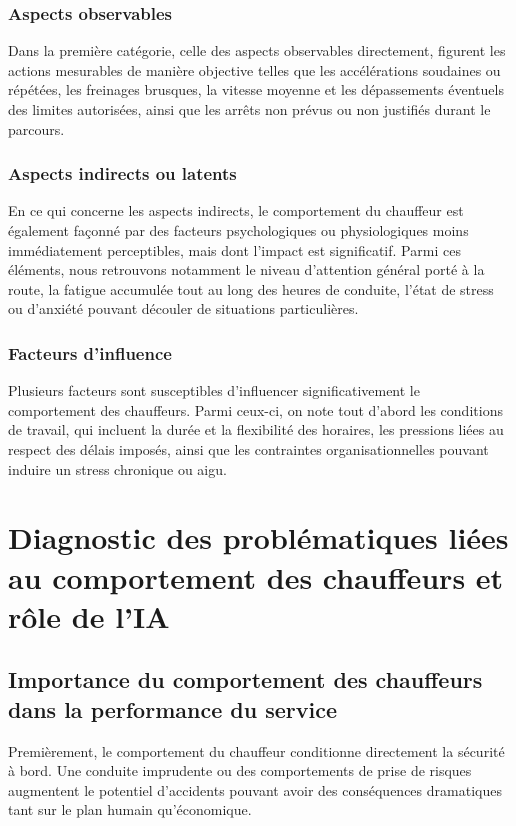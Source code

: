 \documentclass[a4paper, 12pt]{book}
\begin{document}
\subsection{Aspects observables}
Dans la première catégorie, celle des aspects observables directement, figurent les actions mesurables de manière objective telles que les accélérations soudaines ou répétées, les freinages brusques, la vitesse moyenne et les dépassements éventuels des limites autorisées, ainsi que les arrêts non prévus ou non justifiés durant le parcours.

\subsection{Aspects indirects ou latents}
En ce qui concerne les aspects indirects, le comportement du chauffeur est également façonné par des facteurs psychologiques ou physiologiques moins immédiatement perceptibles, mais dont l'impact est significatif. Parmi ces éléments, nous retrouvons notamment le niveau d'attention général porté à la route, la fatigue accumulée tout au long des heures de conduite, l'état de stress ou d'anxiété pouvant découler de situations particulières.

\subsection{Facteurs d'influence}
Plusieurs facteurs sont susceptibles d'influencer significativement le comportement des chauffeurs. Parmi ceux-ci, on note tout d'abord les conditions de travail, qui incluent la durée et la flexibilité des horaires, les pressions liées au respect des délais imposés, ainsi que les contraintes organisationnelles pouvant induire un stress chronique ou aigu.

\chapter{Diagnostic des problématiques liées au comportement des chauffeurs et rôle de l'IA}

\section{Importance du comportement des chauffeurs dans la performance du service}

Premièrement, le comportement du chauffeur conditionne directement la sécurité à bord. Une conduite imprudente ou des comportements de prise de risques augmentent le potentiel d'accidents pouvant avoir des conséquences dramatiques tant sur le plan humain qu'économique.
\end{document}
